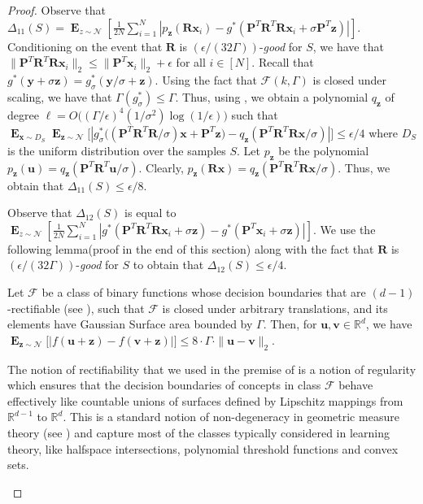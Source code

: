 \documentclass{theoretics}
\newcommand\twonorm[1]{\|#1\|_2}
\renewcommand\vec[1]{\mathbf{#1}}
\DeclareMathOperator*{\E}{\mathbf{E}}
\newcommand{\R}{\mathbb{R}}
\newcommand{\1}{\Ind}
\newcommand{\x}{\vec x}
\renewcommand{\vv}{\vec v}
\newcommand{\vu}{\vec u}
\newcommand{\z}{\vec z}
\newcommand{\F}{\mathcal{F}}
\newcommand{\Gauss}{\mathcal{N}}
\begin{document}
\begin{proof}
Observe that $\Delta_{11}(S)=\E_{z\sim \Gauss}\left[\frac{1}{2N}\sum_{i=1}^{N}|p_{\z}(\vec R\x_i)-g^*(\vec P^T\vec R^T \vec R\x_i+\sigma\vec P^T\z)|\right]$.
Conditioning on the event that $\vec R$ is $(\epsilon/(32\Gamma))$-\textit{good} for $S$, we have that $\twonorm{\vec P^T \vec R^T\vec R \x_i}\leq \twonorm{\vec P^T \x_i}+\epsilon$ for all $i\in [N]$. Recall that $g^*(\vec y+\sigma \z)=g_{\sigma}^*(\vec y/\sigma+\z)$. Using the fact that $\F(k,\Gamma)$ is closed under scaling, we have that $\Gamma(g^*_{\sigma})\leq \Gamma$. Thus, using , we obtain a polynomial $q_{\z}$ of degree $\ell=O\bigl((\Gamma/\epsilon)^4(1/\sigma^2)\log(1/\epsilon))$ such that $\E_{\x\sim D_S}\E_{\z\sim \Gauss}\bigl[|g_{\sigma}^*\bigl((\vec P^T\vec R^T \vec R/ \sigma) \x+\vec P^T\z\bigr)-q_{\z}(\vec P^T\vec R^T\vec R \x/\sigma)|\bigr]\leq \epsilon/4$ where $D_S$ is the uniform distribution over the samples $S$. Let $p_{\z}$ be the polynomial $p_{\z}(\vu)=q_{\z}(\vec P^T\vec R^T\vu/\sigma)$. Clearly, $p_{\z}(\vec R\x)=q_{\z}(\vec P^T\vec R^T\vec R\x/\sigma)$. Thus, we obtain that $\Delta_{11}(S)\leq \epsilon/8$.

Observe that $\Delta_{12}(S)$ is equal to $\E_{z\sim \Gauss}\left[\frac{1}{2N}\sum_{i=1}^{N}|g^*( \vec P^T \vec R^T \vec R\x_i+\sigma\z)-g^*(\vec P^T\x_i+\sigma \z)|\right]$. We use the following lemma(proof in the end of this section) along with the fact that $\vec R$ is $(\epsilon/(32\Gamma))$-\textit{good} for $S$ to obtain that $\Delta_{12}(S)\leq \epsilon/4$. 
\begin{lemma}
\label{lem:gsa_shift}
    Let $\F$ be a class of binary functions whose decision boundaries that are $(d-1)$-rectifiable (see \cite{federer1969geometric}), such that $\F$ is closed under arbitrary translations, and its elements have Gaussian Surface area bounded by $\Gamma$. Then, for $\vu,\vv\in \R^d$, we have $\E_{\z\sim \Gauss}\bigl[|f(\vu+\z)-f(\vv+\z)|\bigr]\leq 8\cdot\Gamma\cdot\twonorm{\vu-\vv}$.
\end{lemma}

\begin{remark}
    The notion of rectifiability that we used in the premise of  is a notion of regularity which ensures that the decision boundaries of concepts in class $\F$ behave effectively like countable unions of surfaces defined by Lipschitz mappings from $\R^{d-1}$ to $\R^d$. This is a standard notion of non-degeneracy in geometric measure theory (see \cite{federer1969geometric}) and capture most of the classes typically considered in learning theory, like halfspace intersections, polynomial threshold functions and convex sets.
\end{remark}


\end{proof}
\end{document}
